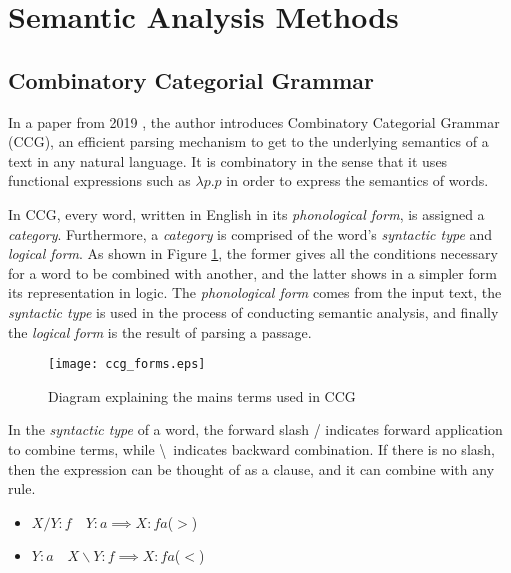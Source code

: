 \label{chapter:related_work}

\section{Semantic Analysis Methods}

\subsection{Combinatory Categorial Grammar} \label{ssec:ccg}

In a paper from 2019 \cite{steedman_combinatory_nodate}, the author introduces Combinatory Categorial Grammar (CCG), an efficient parsing mechanism to get to the underlying semantics of a text in any natural language. It is combinatory in the sense that it uses functional expressions such as $\lambda p.p$ in order to express the semantics of words.

In CCG, every word, written in English in its \textit{phonological form}, is assigned a \textit{category}. Furthermore, a \textit{category} is comprised of the word's \textit{syntactic type} and \textit{logical form}. As shown in Figure \ref{fig:ccg_forms}, the former gives all the conditions necessary for a word to be combined with another, and the latter shows in a simpler form its representation in logic. The \textit{phonological form} comes from the input text, the \textit{syntactic type} is used in the process of conducting semantic analysis, and finally the \textit{logical form} is the result of parsing a passage.

\begin{figure}[H]
\centering
\texttt{[image: ccg\_forms.eps]}
\caption{\cite{steedman_combinatory_nodate} Diagram explaining the mains terms used in CCG}
\label{fig:ccg_forms}
\end{figure}

In the \textit{syntactic type} of a word, the forward slash / indicates forward application to combine terms, while \textbackslash \ indicates backward combination. If there is no slash, then the expression can be thought of as a clause, and it can combine with any rule.

\begin{itemize}[nolistsep]
\item $X/Y:f \quad Y:a \implies X:fa$\quad($>$)
\item $Y:a \quad X\backslash Y:f \implies X:fa$\quad($<$)
\end{itemize}

